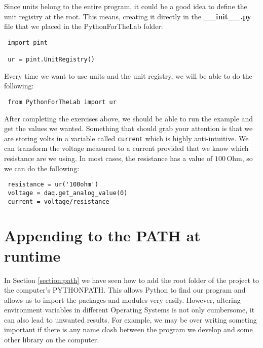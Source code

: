 Since units belong to the entire program, it could be a good idea to define the unit registry at the root. This means, creating it directly in the \textbf{\_\_init\_\_.py} file that we placed in the PythonForTheLab folder:

\begin{verbatim}
 import pint

 ur = pint.UnitRegistry()
\end{verbatim}

Every time we want to use units and the unit registry, we will be able to do the following:

\begin{verbatim}
 from PythonForTheLab import ur
\end{verbatim}



After completing the exercises above, we should be able to run the example and get the values we wanted. Something that should grab your attention is that we are storing volts in a variable called \texttt{current} which is highly anti-intuitive. We can transform the voltage measured to a current provided that we know which resistance are we using. In most cases, the resistance has a value of $100\,\textrm{Ohm}$, so we can do the following:

\begin{verbatim}
 resistance = ur('100ohm')
 voltage = daq.get_analog_value(0)
 current = voltage/resistance
\end{verbatim}

\section{Appending to the PATH at runtime}\label{section:appending-path}
In Section \ref{section:path} we have seen how to add the root folder of the project to the computer's PYTHONPATH. This allows Python to find our program and allows us to import the packages and modules very easily. However, altering environment variables in different Operating Systems is not only cumbersome, it can also lead to unwanted results. For example, we may be over writing someting important if there is any name clash between the program we develop and some other library on the computer.

